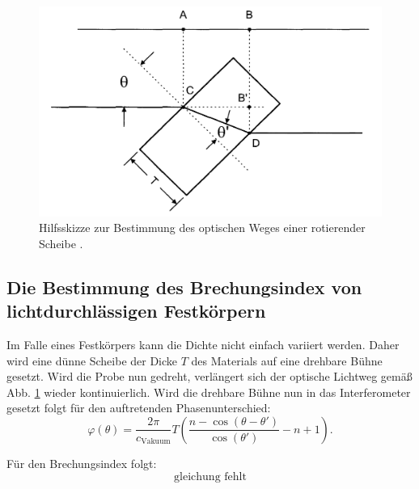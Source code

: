 \begin{figure}
	\centering
	\includegraphics[width=\linewidth-100pt,height=\textheight-100pt,keepaspectratio]{content/Bilder/drehscheibeskizze.png}
	\caption{Hilfsskizze zur Bestimmung des optischen Weges einer rotierender Scheibe \cite{V64}.}
	\label{fig:Drehscheibe}
\end{figure}

\subsection{Die Bestimmung des Brechungsindex von lichtdurchlässigen Festkörpern}
Im Falle eines Festkörpers kann die Dichte nicht einfach variiert werden. Daher wird eine dünne Scheibe der Dicke $T$ des Materials auf eine drehbare Bühne gesetzt. Wird die Probe nun gedreht, verlängert sich der optische Lichtweg gemäß Abb. \ref{fig:Drehscheibe} wieder kontinuierlich. Wird die drehbare Bühne nun in das Interferometer gesetzt folgt für den auftretenden Phasenunterschied:
\begin{equation}
    \varphi(\theta) = \frac{2 \pi}{c_\text{Vakuum}} T \left( \frac{n - \cos(\theta - \theta ')}{\cos(\theta')} - n + 1 \right) \text{.} \label{eq:phi}
\end{equation}

Für den Brechungsindex folgt:
\begin{equation}
\text{gleichung fehlt}
\end{equation}


